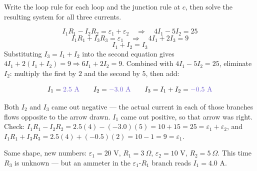 \documentclass[12pt]{article}
\newcommand{\ANS}[1]{\textcolor{accent}{#1}}
\newcommand{\reszig}[1]{%
  \fill[white] ($(#1)+(-0.65,-0.32)$) rectangle ($(#1)+(0.65,0.32)$);
  \draw ($(#1)+(-0.6,0)$)
    -- ($(#1)+(-0.42,0.22)$) -- ($(#1)+(-0.24,-0.22)$)
    -- ($(#1)+(-0.06,0.22)$) -- ($(#1)+(0.12,-0.22)$)
    -- ($(#1)+(0.3,0.22)$) -- ($(#1)+(0.48,-0.22)$)
    -- ($(#1)+(0.6,0)$);
}
\newcommand{\metercirc}[2]{%
  \fill[white] ($(#1)+(-0.3,-0.3)$) rectangle ($(#1)+(0.3,0.3)$);
  \draw ($(#1)$) circle (0.3);
  \node[scale=0.8] at (#1) {$#2$};
}
\newcommand{\batthL}[1]{%
  \draw[line width=0.7pt] ($(#1)+(-0.55,0)$) -- ($(#1)+(-0.12,0)$);
  \draw[line width=0.7pt] ($(#1)+(0.12,0)$) -- ($(#1)+(0.55,0)$);
  \draw[line width=1.1pt] ($(#1)+(-0.12,-0.35)$) -- ($(#1)+(-0.12,0.35)$);
  \draw[line width=2.4pt] ($(#1)+(0.12,-0.2)$) -- ($(#1)+(0.12,0.2)$);
  \node[scale=0.75] at ($(#1)+(-0.12,0.55)$) {$+$};
  \node[scale=0.75] at ($(#1)+(0.12,0.55)$) {$-$};
}
\newcommand{\batthR}[1]{%
  \draw[line width=0.7pt] ($(#1)+(-0.55,0)$) -- ($(#1)+(-0.12,0)$);
  \draw[line width=0.7pt] ($(#1)+(0.12,0)$) -- ($(#1)+(0.55,0)$);
  \draw[line width=2.4pt] ($(#1)+(-0.12,-0.2)$) -- ($(#1)+(-0.12,0.2)$);
  \draw[line width=1.1pt] ($(#1)+(0.12,-0.35)$) -- ($(#1)+(0.12,0.35)$);
  \node[scale=0.75] at ($(#1)+(-0.12,0.55)$) {$-$};
  \node[scale=0.75] at ($(#1)+(0.12,0.55)$) {$+$};
}
\newcommand{\reszigv}[1]{%
  \fill[white] ($(#1)+(-0.32,-0.65)$) rectangle ($(#1)+(0.32,0.65)$);
  \draw ($(#1)+(0,-0.6)$)
    -- ($(#1)+(0.22,-0.42)$) -- ($(#1)+(-0.22,-0.24)$)
    -- ($(#1)+(0.22,-0.06)$) -- ($(#1)+(-0.22,0.12)$)
    -- ($(#1)+(0.22,0.3)$) -- ($(#1)+(-0.22,0.48)$)
    -- ($(#1)+(0,0.6)$);
}
\newcommand{\twoloopdots}{%
  \filldraw (0,4) circle (1.5pt); \node[scale=0.8, anchor=south east] at (-0.05,4.05) {$e$};
  \filldraw (6,4) circle (1.5pt); \node[scale=0.8, anchor=south west] at (6.05,4.05) {$f$};
  \filldraw (0,2) circle (1.5pt); \node[scale=0.8, anchor=east] at (-0.1,2) {$b$};
  \filldraw (6,2) circle (1.5pt); \node[scale=0.8, anchor=west] at (6.1,2) {$c$};
  \filldraw (0,0) circle (1.5pt); \node[scale=0.8, anchor=north east] at (-0.05,-0.05) {$a$};
  \filldraw (6,0) circle (1.5pt); \node[scale=0.8, anchor=north west] at (6.05,-0.05) {$d$};
}
\begin{document}
Write the loop rule for each loop and the junction rule at $c$, then solve
the resulting system for all three currents.

{\small
\[
I_1R_1-I_2R_2=\varepsilon_1+\varepsilon_2 \quad\Rightarrow\quad 4I_1-5I_2=25
\]
\[
I_1R_1+I_3R_3=\varepsilon_1 \quad\Rightarrow\quad 4I_1+2I_3=9
\]
\[
I_1+I_2=I_3
\]
Substituting $I_3=I_1+I_2$ into the second equation gives
$4I_1+2(I_1+I_2)=9 \Rightarrow 6I_1+2I_2=9$. Combined with
$4I_1-5I_2=25$, eliminate $I_2$: multiply the first by $2$ and the second
by $5$, then add:}

\[
I_1 = \ANS{2.5\text{ A}} \qquad I_2 = \ANS{-3.0\text{ A}} \qquad
I_3 = I_1+I_2 = \ANS{-0.5\text{ A}}
\]


{\small\color{accent} Both $I_2$ and $I_3$ came out negative --- the actual
current in each of those branches flows opposite to the arrow drawn. $I_1$
came out positive, so that arrow was right. Check: $I_1R_1-I_2R_2=
2.5(4)-(-3.0)(5)=10+15=25=\varepsilon_1+\varepsilon_2$, and
$I_1R_1+I_3R_3=2.5(4)+(-0.5)(2)=10-1=9=\varepsilon_1$. \checkmark}


Same shape, new numbers: $\varepsilon_1=20$ V, $R_1=3\ \Omega$,
$\varepsilon_2=10$ V, $R_2=5\ \Omega$. This time $R_3$ is unknown --- but an
ammeter in the $\varepsilon_1$-$R_1$ branch reads $I_1=4.0$ A.

\begin{center}
\end{center}
\end{document}
